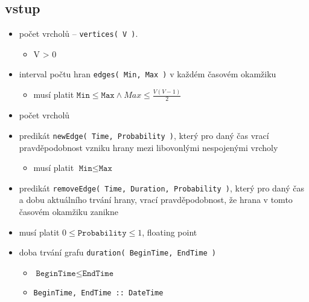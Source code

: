\documentclass[11pt, a4paper,draft]{article}
\newcommand{\pl}[1]{\texttt{#1}} %
\theoremstyle{plain}
\theoremstyle{definition}
\theoremstyle{remark}
\begin{document}
\subsection{vstup}
\begin{itemize}
    \item počet vrcholů -- \pl{vertices( V )}.
        \begin{itemize}
            \item V > 0
        \end{itemize}
    \item interval počtu hran \pl{edges( Min, Max )} v každém časovém okamžiku
        \begin{itemize}
            \item musí platit $\pl{Min} \le \pl{Max} \land Max \le \frac{ V(V-1)}{2}$
        \end{itemize}
    \item počet vrcholů
    \item predikát \pl{newEdge( Time, Probability )}, který pro daný čas vrací
          pravděpodobnost vzniku hrany mezi libovonlými nespojenými vrcholy
        \begin{itemize}
            \item musí platit $\pl{Min} \le \pl{Max}$
        \end{itemize}
    \item predikát \pl{removeEdge( Time, Duration, Probability )}, který pro daný čas
    a dobu aktuálního trvání hrany, vrací pravděpodobnost, že hrana v tomto
    časovém okamžiku zanikne
    \item musí platit $0 \le \pl{Probability} \le 1$, floating point
    \item doba trvání grafu \pl{duration( BeginTime, EndTime )}
        \begin{itemize}
            \item $\pl{BeginTime} \le \pl{EndTime}$
            \item \texttt{BeginTime, EndTime :: DateTime}
        \end{itemize}
\end{itemize}
\end{document}
